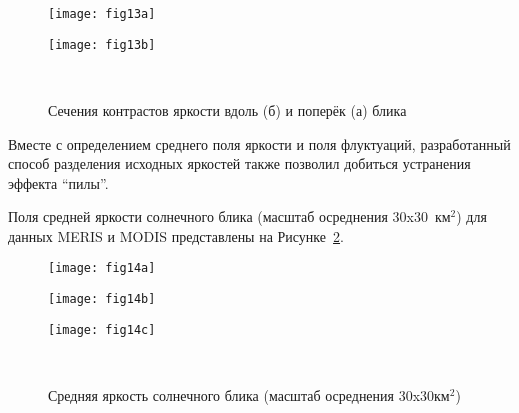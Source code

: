 \begin{figure}[H]
    	\centering
	\begin{minipage}{.47\textwidth}
	    \subcaptionbox{\label{fig:13a}}
		{\texttt{[image: fig13a]}}
	\end{minipage}
	\hfill
	\begin{minipage}{.47\textwidth}
	    \subcaptionbox{\label{fig:13b}}
		{\texttt{[image: fig13b]}}
	\end{minipage}
	\\
    \caption{Сечения контрастов яркости вдоль (б) и поперёк (а) блика}
    \label{fig:13}
\end{figure}




Вместе с определением среднего поля яркости и поля флуктуаций, разработанный способ разделения исходных яркостей также позволил добиться устранения эффекта ``пилы''.

Поля средней яркости солнечного блика (масштаб осреднения 30x30~км${}^2$) для данных MERIS и MODIS представлены на Рисунке~\ref{fig:14}.

\begin{figure}[H]
    	\centering
	\begin{minipage}{.31\textwidth}
	    \subcaptionbox{\label{fig:14a}}
		{\texttt{[image: fig14a]}}
	\end{minipage}
	\hfill
	\begin{minipage}{.31\textwidth}
	    \subcaptionbox{\label{fig:14b}}
		{\texttt{[image: fig14b]}}
	\end{minipage}
	\hfill
	\begin{minipage}{.31\textwidth}
	    \subcaptionbox{\label{fig:14c}}
		{\texttt{[image: fig14c]}}
	\end{minipage}
	\\
    \caption{Средняя яркость солнечного блика (масштаб осреднения 30x30км${}^2$)}
    \label{fig:14}
\end{figure}




